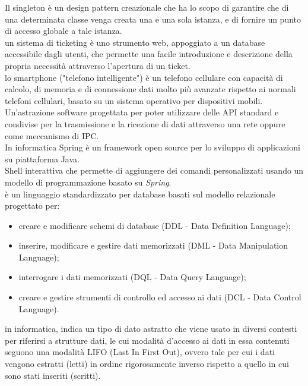 \documentclass{scalatekids-article}
\begin{document}
   Il singleton è un design pattern creazionale che ha lo scopo di garantire che di una determinata classe venga creata una e una sola istanza, e di fornire un punto di accesso globale a tale istanza.
  \\

   un sistema di ticketing è uno strumento web, appoggiato a un database accessibile dagli utenti, che permette una facile introduzione e descrizione della propria necessità attraverso l’apertura di un ticket.
  \\

   lo smartphone ("telefono intelligente") è un telefono cellulare con capacità di calcolo, di memoria e di connessione dati molto più avanzate rispetto ai normali telefoni cellulari, basato su un sistema operativo per dispositivi mobili.
  \\

   Un'astrazione software progettata per poter utilizzare delle API standard e condivise per la trasmissione e la ricezione di dati attraverso una rete oppure come meccanismo di IPC.
  \\
  
   In informatica Spring è un framework open source per lo sviluppo di applicazioni su piattaforma Java.
  \\  
  
   Shell interattiva che permette di aggiungere dei comandi personalizzati usando un modello di programmazione basato su \textit{Spring}.
  \\

   è un linguaggio standardizzato per database basati sul modello relazionale progettato per:
  \begin{itemize}
  	\item creare e modificare schemi di database (DDL - Data Definition Language);
  	\item inserire, modificare e gestire dati memorizzati (DML - Data Manipulation Language);
  	\item interrogare i dati memorizzati (DQL - Data Query Language);
  	\item creare e gestire strumenti di controllo ed accesso ai dati (DCL - Data Control Language).
  \end{itemize}

   in informatica, indica un tipo di dato astratto che viene usato in diversi contesti per riferirsi a strutture dati, le cui modalità d'accesso ai dati in essa contenuti seguono una modalità LIFO (Last In First Out), ovvero tale per cui i dati vengono estratti (letti) in ordine rigorosamente inverso rispetto a quello in cui sono stati inseriti (scritti).
  \\
\end{document}
